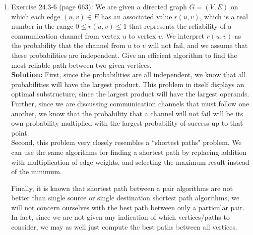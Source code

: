 \documentclass[11pts]{article}
\begin{document}
\begin{enumerate}
\begin{algorithm}{FIND-PREDECESSORS}[ L((1...n)(1...n)), W((1...n)(1...n)) ]{
   }
   \\
  \qdo
    \\
    \qdo
      \\
      \qdo \\
         \\
        \qthen
            \pi_{i,j} = k
        \qfi
      \qrof
    \qrof
  \qrof
  
\end{algorithm}

\newpage
\item Exercise 24.3-6 (page 663): We are given a directed graph
$G = ( V, E )$ on which each edge $( u, v ) \in E$ has an
associated value $r( u, v )$, which is a real number in the range
$0 \le r( u, v ) \le 1$ that
represents the reliability of a communication channel from vertex $u$
to vertex $v$.
We interpret $r( u, v )$ as the probability that the channel
from $u$ to $v$ will not fail,
and we assume that these probabilities are independent. Give an efficient
algorithm to find the most reliable path between two given vertices.\\

  \textbf{Solution:} First, since the probabilities are all independent,
  we know that all probabilities will have the largest product. This problem
  in itself displays an optimal substructure, since the largest product
  will have the largest operands. Further, since we are discussing
  communication channels that must follow one another, we know that the
  probability that a channel will not fail will be its own probability
  multiplied with the largest probability of success up to that point. \\

  Second, this problem very closely resembles a ``shortest paths" problem.
  We can use the same algorithms for finding a shortest path by replacing
  addition with multiplication of edge weights, and selecting the maximum
  result instead of the minimum.

  Finally, it is known that shortest path between a pair algorithms are not
  better than single source or single destination shortest path algorithms,
  we will not concern ourselves with the best path between only a particular
  pair. In fact, since we are not given any indication of which vertices/paths
  to consider, we may as well just compute the best paths between all vertices.


\end{enumerate}
\end{document}
